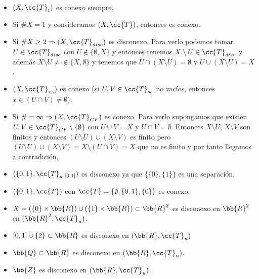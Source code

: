 \begin{ejemplo}\
    \begin{itemize}
        \item $(X, \cc{T}_t)$ es conexo siempre.
        \item Si $\#X=1$ y consideramos $(X, \cc{T})$, entonces es conexo.
        \item Si $\#X\geq 2 \Rightarrow (X, \cc{T}_{disc})$ es disconexo. Para verlo podemos tomar $U\in \cc{T}_{disc}$ con $U\notin \{\emptyset, X\}$ y entonces tenemos $X\setminus U\in \cc{T}_{disc}$ y además $X\setminus U\neq \notin \{X, \emptyset\}$ y tenemos que $U\cap (X\setminus U) = \emptyset$ y $U\cup (X\setminus U) = X$.
        \item $(X, \cc{T}_{x_0})$ es conexo (si $U,V\in \cc{T}_{s_0}$ no vacíos, entonces $x\in (U\cap V) \neq \emptyset$).
        \item Si $\#=\infty \Rightarrow (X, \cc{T}_{CF})$ es conexo. Para verlo supongamos que existen $U,V\in \cc{T}_{CF}\setminus \{\emptyset\}$ con $U\cup V =X$ y $U\cap V = \emptyset$. Entonces $X\setminus U$, $X\setminus V$ son finitos y entonces $(U\setminus U)\cup (X\setminus V)$ es finito pero $(U\setminus U)\cup (X\setminus V) = X \setminus (U\cap V) = X$ que no es finito y por tanto llegamos a contradición.
        \item $(\{0,1\}, \cc{T}_u|_{[0,1]})$ es disconexo ya que $\{\{0\}, \{1\}\}$ es una separación.
        \item $(\{0,1\}, \cc{T})$ con $\cc{T}=\{\emptyset, \{0,1\}, \{0\}\}$ es conexo.
        \item $X=(\{0\}\times \bb{R})\cup (\{1\}\times \bb{R})\subset \bb{R}^2$ es disconexo en $\bb{R}^2$ en $(\bb{R}^2, \cc{T}_u)$.
        \item $[0,1]\cup \{2\}\subset \bb{R}$ es disconexo en $(\bb{R}, \cc{T}_u)$ 
        \item $\bb{Q}\subset \bb{R}$ es disconexo en $(\bb{R}, \cc{T}_u)$.
        \item $\bb{Z}$ es disconexo en $(\bb{R}, \cc{T}_u)$.
    \end{itemize}
    \endsquare
\end{ejemplo}

